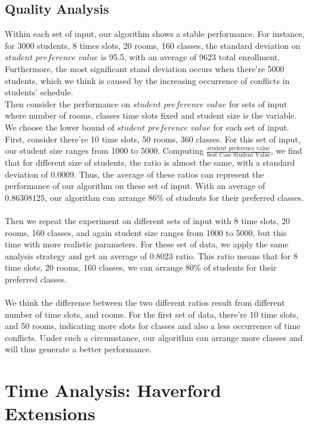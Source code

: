\documentclass[11pt, oneside]{article}   	%
\begin{document}
\subsection{Quality Analysis}
Within each set of input, our algorithm shows a stable performance. For instance, for 3000 students, 8 times slots, 20 rooms, 160 classes, the standard deviation on $student$  $preference$  $value$ is 95.5, with an average of 9623 total enrollment. Furthermore, the most significant stand deviation occurs when there're 5000 students, which we think is caused by the increasing occurrence of conflicts in students' schedule. 
\\Then consider the performance on $student$ $preference$ $value$ for sets of input where number of rooms, classes time slots fixed and student size is the variable. We choose the lower bound of $student$ $preference$ $value$ for each set of input. First, consider there're 10 time slots, 50 rooms, 360 classes. For this set of input, our student size ranges from 1000 to 5000. Computing $\frac{\text{student preference value}}{\text{best Case Student Value}}$, we find that for different size of students, the ratio is almost the same, with a standard deviation of 0.0009. Thus, the average of these ratios can represent the performance of our algorithm on these set of input. With an average of $0.86308125$, our algorithm can arrange $86\%$ of students for their preferred classes.\\ \\Then we repeat the experiment on different sets of input with 8 time slots, 20 rooms, 160 classes, and again student size ranges from 1000 to 5000, but this time with more realistic parameters. For these set of data, we apply the same analysis strategy and get an average of $0.8023$ ratio. This ratio means that for 8 time slots, 20 rooms, 160 classes, we can arrange $80\%$ of students for their preferred classes.\\
\\We think the difference between the two different ratios result from different number of time slots, and rooms. For the first set of data, there're 10 time slots, and 50 rooms, indicating more slots for classes and also a less occurrence of time conflicts. Under such a circumstance, our algorithm can arrange more classes and will thus generate a better performance.
\section{Time Analysis: Haverford Extensions}
\end{document}
